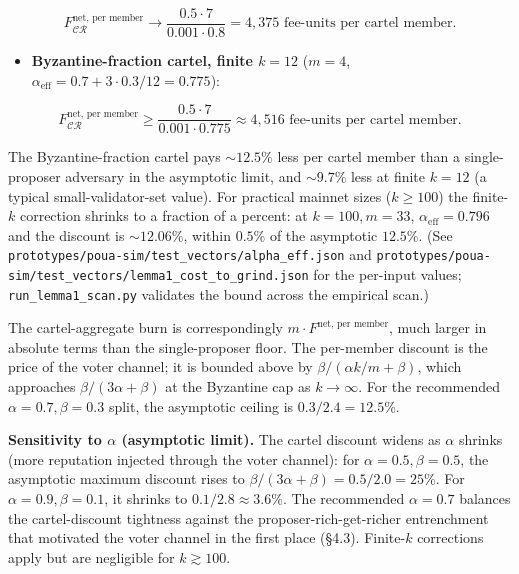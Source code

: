 \documentclass[
  11pt,
]{article}
\providecommand{\tightlist}{%
  \setlength{\itemsep}{0pt}\setlength{\parskip}{0pt}}
\begin{document}
\[F_{\mathcal{CR}}^{\text{net, per member}} \to \frac{0.5 \cdot 7}{0.001 \cdot 0.8} = 4{,}375 \text{ fee-units per cartel member.}\]

\begin{itemize}
\tightlist
\item
  \textbf{Byzantine-fraction cartel, finite \(k = 12\)} (\(m = 4\),
  \(\alpha_{\text{eff}} = 0.7 + 3 \cdot 0.3 / 12 = 0.775\)):
\end{itemize}

\[F_{\mathcal{CR}}^{\text{net, per member}} \geq \frac{0.5 \cdot 7}{0.001 \cdot 0.775} \approx 4{,}516 \text{ fee-units per cartel member.}\]

The Byzantine-fraction cartel pays \(\sim 12.5\%\) less per cartel
member than a single-proposer adversary in the asymptotic limit, and
\(\sim 9.7\%\) less at finite \(k = 12\) (a typical small-validator-set
value). For practical mainnet sizes (\(k \geq 100\)) the finite-\(k\)
correction shrinks to a fraction of a percent: at \(k = 100, m = 33\),
\(\alpha_{\text{eff}} = 0.796\) and the discount is \(\sim 12.06\%\),
within \(0.5\%\) of the asymptotic \(12.5\%\). (See
\texttt{prototypes/poua-sim/test\_vectors/alpha\_eff.json} and
\texttt{prototypes/poua-sim/test\_vectors/lemma1\_cost\_to\_grind.json}
for the per-input values; \texttt{run\_lemma1\_scan.py} validates the
bound across the empirical scan.)

The cartel-aggregate burn is correspondingly
\(m \cdot F^{\text{net, per member}}\), much larger in absolute terms
than the single-proposer floor. The per-member discount is the price of
the voter channel; it is bounded above by
\(\beta / (\alpha k / m + \beta)\), which approaches
\(\beta / (3 \alpha + \beta)\) at the Byzantine cap as \(k \to \infty\).
For the recommended \(\alpha = 0.7, \beta = 0.3\) split, the asymptotic
ceiling is \(0.3 / 2.4 = 12.5\%\).

\textbf{Sensitivity to \(\alpha\) (asymptotic limit).} The cartel
discount widens as \(\alpha\) shrinks (more reputation injected through
the voter channel): for \(\alpha = 0.5, \beta = 0.5\), the asymptotic
maximum discount rises to \(\beta/(3\alpha + \beta) = 0.5/2.0 = 25\%\).
For \(\alpha = 0.9, \beta = 0.1\), it shrinks to
\(0.1/2.8 \approx 3.6\%\). The recommended \(\alpha = 0.7\) balances the
cartel-discount tightness against the proposer-rich-get-richer
entrenchment that motivated the voter channel in the first place (§4.3).
Finite-\(k\) corrections apply but are negligible for \(k \gtrsim 100\).
\end{document}
